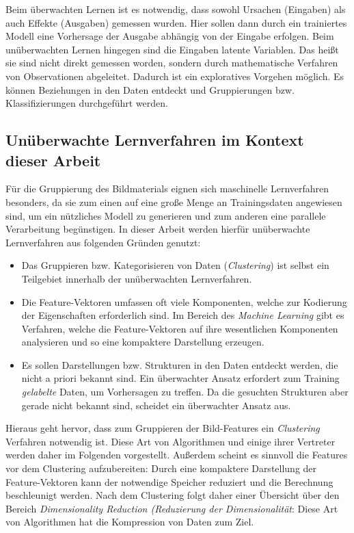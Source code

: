 Beim überwachten Lernen ist es notwendig, dass sowohl Ursachen (Eingaben) als auch Effekte (Ausgaben) gemessen wurden. Hier sollen dann durch ein trainiertes Modell eine Vorhersage der Ausgabe abhängig von der Eingabe erfolgen. Beim unüberwachten Lernen hingegen sind die Eingaben latente Variablen. Das heißt sie sind nicht direkt gemessen worden, sondern durch mathematische Verfahren von Observationen abgeleitet. Dadurch ist ein exploratives Vorgehen möglich. Es können Beziehungen in den Daten entdeckt und Gruppierungen bzw. Klassifizierungen durchgeführt werden.

\subsection{Unüberwachte Lernverfahren im Kontext dieser Arbeit}

Für die Gruppierung des Bildmaterials eignen sich maschinelle Lernverfahren besonders, da sie zum einen auf eine große Menge an Trainingsdaten angewiesen sind, um ein nützliches Modell zu generieren und zum anderen eine parallele Verarbeitung begünstigen. In dieser Arbeit werden hierfür unüberwachte Lernverfahren aus folgenden Gründen genutzt:

\begin{itemize}
	\item Das Gruppieren bzw. Kategorisieren von Daten (\textit{Clustering}) ist selbst ein Teilgebiet innerhalb der unüberwachten Lernverfahren.
	\item Die Feature-Vektoren umfassen oft viele Komponenten, welche zur Kodierung der Eigenschaften erforderlich sind. Im Bereich des \textit{Machine Learning} gibt es Verfahren, welche die Feature-Vektoren auf ihre wesentlichen Komponenten analysieren und so eine kompaktere Darstellung erzeugen.
	\item Es sollen Darstellungen bzw. Strukturen in den Daten entdeckt werden, die nicht a priori bekannt sind. Ein überwachter Ansatz erfordert zum Training \textit{gelabelte} Daten, um Vorhersagen zu treffen. Da die gesuchten Strukturen aber gerade nicht bekannt sind, scheidet ein überwachter Ansatz aus.
\end{itemize}

Hieraus geht hervor, dass zum Gruppieren der Bild-Features ein \textit{Clustering} Verfahren notwendig ist. Diese Art von Algorithmen und einige ihrer Vertreter werden daher im Folgenden vorgestellt. Außerdem scheint es sinnvoll die Features vor dem Clustering aufzubereiten: Durch eine kompaktere Darstellung der Feature-Vektoren kann der notwendige Speicher reduziert und die Berechnung beschleunigt werden. Nach dem Clustering folgt daher einer Übersicht über den Bereich \textit{Dimensionality Reduction (Reduzierung der Dimensionalität}: Diese Art von Algorithmen hat die Kompression von Daten zum Ziel.

